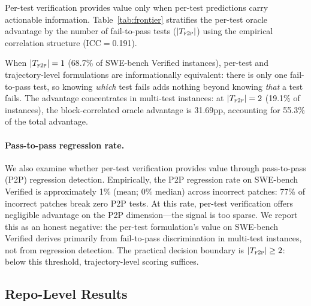 Per-test verification provides value only when per-test predictions carry actionable information.
Table~\ref{tab:frontier} stratifies the per-test oracle advantage by the number of fail-to-pass tests ($|T_{\textsc{f2p}}|$) using the empirical correlation structure (ICC$=$0.191).

When $|T_{\textsc{f2p}}| = 1$ (68.7\% of SWE-bench Verified instances), per-test and trajectory-level formulations are informationally equivalent: there is only one fail-to-pass test, so knowing \emph{which} test fails adds nothing beyond knowing \emph{that} a test fails.
The advantage concentrates in multi-test instances: at $|T_{\textsc{f2p}}| = 2$ (19.1\% of instances), the block-correlated oracle advantage is 31.69pp, accounting for 55.3\% of the total advantage.

\paragraph{Pass-to-pass regression rate.}
We also examine whether per-test verification provides value through pass-to-pass (P2P) regression detection.
Empirically, the P2P regression rate on SWE-bench Verified is approximately 1\% (mean; 0\% median) across incorrect patches: 77\% of incorrect patches break zero P2P tests.
At this rate, per-test verification offers negligible advantage on the P2P dimension---the signal is too sparse.
We report this as an honest negative: the per-test formulation's value on SWE-bench Verified derives primarily from fail-to-pass discrimination in multi-test instances, not from regression detection.
The practical decision boundary is $|T_{\textsc{f2p}}| \geq 2$: below this threshold, trajectory-level scoring suffices.


\subsection{Repo-Level Results}
\label{ssec:repo_results}


